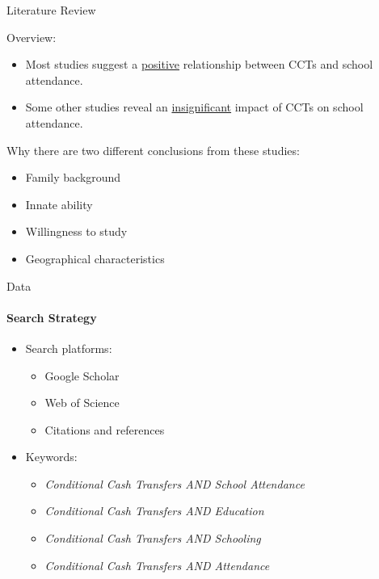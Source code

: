 \documentclass{beamer}
\begin{document}

\begin{frame}{Literature Review}

Overview:

\begin{itemize}
    \item Most studies suggest a \underline{positive} relationship between CCTs and school attendance.
    \item Some other studies reveal an \underline{insignificant} impact of CCTs on school attendance.
\end{itemize}

Why there are two different conclusions from these studies:

\begin{itemize}
    \item Family background
    \item Innate ability
    \item Willingness to study
    \item Geographical characteristics
\end{itemize}

\end{frame}


\begin{frame}{Data}
\framesubtitle{Search Strategy}

\begin{itemize}
    \item Search platforms:
    \begin{itemize}
        \item Google Scholar
        \item Web of Science
        \item Citations and references
    \end{itemize}
    \item Keywords:
    \begin{itemize}
        \item \textit{Conditional Cash Transfers AND School Attendance}
        \item \textit{Conditional Cash Transfers AND Education}
        \item \textit{Conditional Cash Transfers AND Schooling}
        \item \textit{Conditional Cash Transfers AND Attendance}
    \end{itemize}
\end{itemize}
    
\end{frame}
\end{document}
